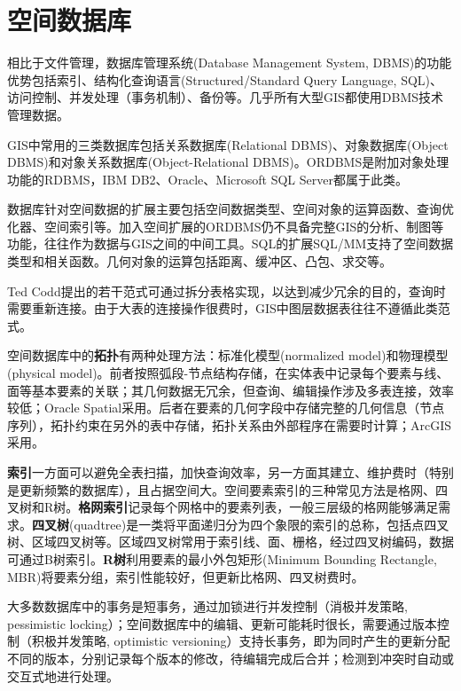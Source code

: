 \section{空间数据库}
\par 相比于文件管理，数据库管理系统(Database Management System, DBMS)的功能优势包括索引、结构化查询语言(Structured/Standard Query Language, SQL)、访问控制、并发处理（事务机制）、备份等。几乎所有大型GIS都使用DBMS技术管理数据。

\par GIS中常用的三类数据库包括关系数据库(Relational DBMS)、对象数据库(Object DBMS)和对象关系数据库(Object-Relational DBMS)。ORDBMS是附加对象处理功能的RDBMS，IBM DB2、Oracle、Microsoft SQL Server都属于此类。

\par 数据库针对空间数据的扩展主要包括空间数据类型、空间对象的运算函数、查询优化器、空间索引等。加入空间扩展的ORDBMS仍不具备完整GIS的分析、制图等功能，往往作为数据与GIS之间的中间工具。SQL的扩展SQL/MM支持了空间数据类型和相关函数。几何对象的运算包括距离、缓冲区、凸包、求交等。

\par Ted Codd提出的若干范式可通过拆分表格实现，以达到减少冗余的目的，查询时需要重新连接。由于大表的连接操作很费时，GIS中图层数据表往往不遵循此类范式。

\par 空间数据库中的\textbf{拓扑}有两种处理方法：标准化模型(normalized model)和物理模型(physical model)。前者按照弧段-节点结构存储，在实体表中记录每个要素与线、面等基本要素的关联；其几何数据无冗余，但查询、编辑操作涉及多表连接，效率较低；Oracle Spatial采用。后者在要素的几何字段中存储完整的几何信息（节点序列），拓扑约束在另外的表中存储，拓扑关系由外部程序在需要时计算；ArcGIS采用。

\par \textbf{索引}一方面可以避免全表扫描，加快查询效率，另一方面其建立、维护费时（特别是更新频繁的数据库），且占据空间大。空间要素索引的三种常见方法是格网、四叉树和R树。\textbf{格网索引}记录每个网格中的要素列表，一般三层级的格网能够满足需求。\textbf{四叉树}(quadtree)是一类将平面递归分为四个象限的索引的总称，包括点四叉树、区域四叉树等。区域四叉树常用于索引线、面、栅格，经过四叉树编码，数据可通过B树索引。\textbf{R树}利用要素的最小外包矩形(Minimum Bounding Rectangle,  MBR)将要素分组，索引性能较好，但更新比格网、四叉树费时。

\par 大多数数据库中的事务是短事务，通过加锁进行并发控制（消极并发策略, pessimistic locking）；空间数据库中的编辑、更新可能耗时很长，需要通过版本控制（积极并发策略, optimistic versioning）支持长事务，即为同时产生的更新分配不同的版本，分别记录每个版本的修改，待编辑完成后合并；检测到冲突时自动或交互式地进行处理。

